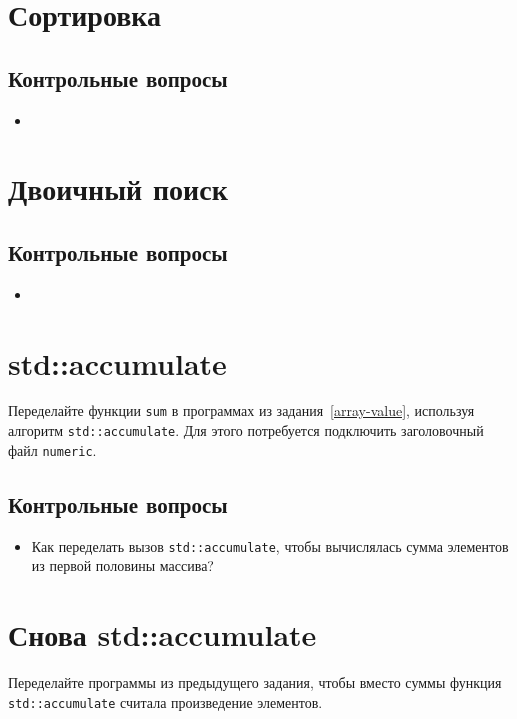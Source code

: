 \documentclass[10pt,twoside,openany]{book}
\begin{document}
\section{Сортировка}

\subsection*{Контрольные вопросы}

\begin{itemize}
    \item
\end{itemize}

\section{Двоичный поиск}

\subsection*{Контрольные вопросы}

\begin{itemize}
    \item
\end{itemize}

\section{std::accumulate}

Переделайте функции {\tt sum} в программах из задания~\ref{array-value},
используя алгоритм {\tt std::accumulate}.
Для этого потребуется подключить заголовочный файл {\tt numeric}.

\subsection*{Контрольные вопросы}

\begin{itemize}
    \item Как переделать вызов {\tt std::accumulate}, чтобы вычислялась сумма элементов
          из первой половины массива?
\end{itemize}

\section{Снова std::accumulate}

Переделайте программы из предыдущего задания, чтобы вместо суммы функция {\tt std::accumulate} считала
произведение элементов.
\end{document}
